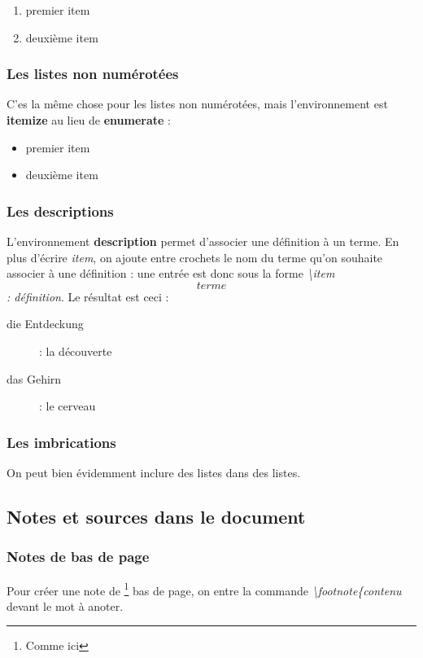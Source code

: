 \documentclass[a4paper, 10pt]{book}
\begin{document}
\begin{enumerate}
\item premier item
\item deuxième item
\end{enumerate}

\subsubsection{Les listes non numérotées}
C'es la même chose pour les listes non numérotées, mais l'environnement est \textbf{itemize} au lieu de \textbf{enumerate} : 

\begin{itemize}
\item premier item
\item deuxième item
\end{itemize}

\subsubsection{Les descriptions}
L'environnement \textbf{description} permet d'associer une définition à un terme. En plus d'écrire \textit{item}, on ajoute entre crochets le nom du terme qu'on souhaite associer à une définition : une entrée est donc sous la forme \textit{\textbackslash item\[terme\] : définition}. Le résultat est ceci :

\begin{description}
\item[die Entdeckung] : la découverte
\item[das Gehirn] : le cerveau
\end{description}

\subsubsection{Les imbrications}
On peut bien évidemment inclure des listes dans des listes.

\subsection{Notes et sources dans le document}
\subsubsection{Notes de bas de page}
Pour créer une note de \footnote{Comme ici} bas de page, on entre la commande \textit{\textbackslash footnote\{contenu } devant le mot à anoter.
\end{document}

